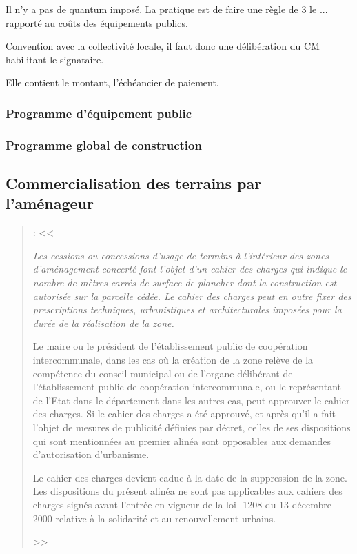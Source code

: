 		Il n'y a pas de quantum imposé. La pratique est de faire une règle de 3 le ... rapporté au coûts des équipements publics.

		Convention avec la collectivité locale, il faut donc une délibération du CM habilitant le signataire.

		Elle contient le montant, l'échéancier de paiement.


		\subsubsection{Programme d'équipement public}

		\subsubsection{Programme global de construction}

	\subsection{Commercialisation des terrains par l'aménageur}

		\begin{quote}
			\textbf{} :
			<<
			{\itshape Les cessions ou concessions d'usage de terrains à l'intérieur des zones d'aménagement concerté font l'objet d'un cahier des charges qui indique le nombre de mètres carrés de surface de plancher dont la construction est autorisée sur la parcelle cédée. Le cahier des charges peut en outre fixer des prescriptions techniques, urbanistiques et architecturales imposées pour la durée de la réalisation de la zone.

			\medskip Le maire ou le président de l'établissement public de coopération intercommunale, dans les cas où la création de la zone relève de la compétence du conseil municipal ou de l'organe délibérant de l'établissement public de coopération intercommunale, ou le représentant de l'Etat dans le département dans les autres cas, peut approuver le cahier des charges. Si le cahier des charges a été approuvé, et après qu'il a fait l'objet de mesures de publicité définies par décret, celles de ses dispositions qui sont mentionnées au premier alinéa sont opposables aux demandes d'autorisation d'urbanisme.

			\medskip Le cahier des charges devient caduc à la date de la suppression de la zone. Les dispositions du présent alinéa ne sont pas applicables aux cahiers des charges signés avant l'entrée en vigueur de la loi -1208 du 13 décembre 2000 relative à la solidarité et au renouvellement urbains.} >>
		\end{quote}

